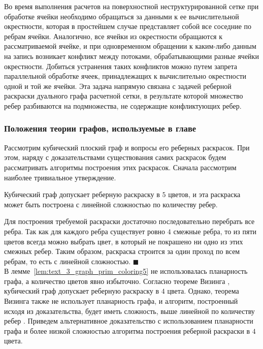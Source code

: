 Во время выполнения расчетов на поверхностной неструктурированной сетке при обработке ячейки необходимо обращаться за данными к ее вычислительной окрестности\label{term:cell_calc_template3}, которая в простейшем случае представляет собой все соседние по ребрам ячейки.
Аналогично, все ячейки из окрестности обращаются к рассматриваемой ячейке, и при одновременном обращении к каким-либо данным на запись возникает конфликт между потоками, обрабатывающими разные ячейки окрестности.
Добиться устранения таких конфликтов можно путем запрета параллельной обработке ячеек, принадлежащих к вычислительно окрестности одной и той же ячейки.
Эта задача напрямую связана с задачей реберной раскраски дуального графа расчетной сетки, в результате которой множество ребер разбиваются на подмножества, не содержащие конфликтующих ребер.

\subsubsection{Положения теории графов, используемые в главе}\label{sec:text_3_graph_prim}

Рассмотрим кубический плоский граф\label{term:graph_cubic} и вопросы его реберных раскрасок.
При этом, наряду с доказательствами существования самих раскрасок будем рассматривать алгоритмы построения этих раскрасок.
Сначала рассмотрим наиболее тривиальное утверждение.


\begin{lemma}\label{lem:text_3_graph_prim_coloring5}
Кубический граф допускает реберную раскраску в $5$ цветов, и эта раскраска может быть построена с линейной сложностью по количеству ребер.
\end{lemma}
Для построения требуемой раскраски достаточно последовательно перебрать все ребра.
Так как для каждого ребра существует ровно $4$ смежные ребра, то из пяти цветов всегда можно выбрать цвет, в который не покрашено ни одно из этих смежных ребер.
Таким образом, раскраска строится за один проход по всем ребрам, то есть с линейной сложностью.
$\blacksquare$\\


В лемме~\ref{lem:text_3_graph_prim_coloring5} не использовалась планарность графа, а количество цветов явно избыточно.
Согласно теореме Визинга \cite{Vizing1964}, \cite{Vizing1965} кубический граф допускает реберную раскраску в $4$ цвета.
Однако, теорема Визинга также не использует планарность графа, и алгоритм, построенный исходя из доказательства, будет иметь сложность, выше линейной по количеству ребер \cite{Soifer2009}.
Приведем альтернативное доказательство с использованием планарности графа и более низкой сложностью алгоритма построения реберной раскраски в $4$ цвета.

